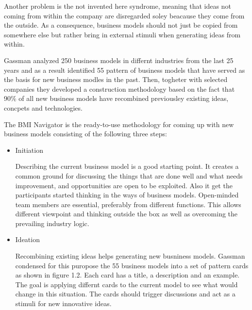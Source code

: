 \begin{itemize}
\begin{itemize}
				Another problem is the not invented here syndrome, meaning that ideas not coming from within the company are disregarded soley beacause they come from the outside. As a consequence, business models should not just be copied from somewhere else but rather bring in external stimuli when generating ideas from within.

				Gassman analyzed 250 business models in differnt industries from the last 25 years and as a result identified 55 pattern of business models that have served as the basis for new business modles in the past. Then, togheter with selected companies they developed a construction methodology based on the fact that 90\% of all new business models have recombined previousley existing ideas, concpets and  technologies.

				The BMI Navigator is the ready-to-use methodology for coming up with new business models consisting of the following three steps:

				\begin{itemize}
					\item Initiation

					Describing the current business model is a good starting point. It creates a common ground for discussing the things that are done well and what needs improvement, and opportunities are open to be exploited. Also it get the participants started thinking in the ways of business models.
					Open-minded team members are essential, preferably from different functions. This allows different viewpoint and thinking outside the box as well as overcoming the prevailing industry logic.

					\item Ideation

					Recombining existing ideas helps generating new busniness models. Gassman  condensed for this puropose the 55 business models into a set of pattern cards as shown in figure 1.2. Each card has a title, a description and an example. The goal is applying differnt cards to the current model to see what would change in this situation. The cards should trigger discussions and act as a stimuli for new innovative ideas.


\end{itemize}
\end{itemize}
\end{itemize}
